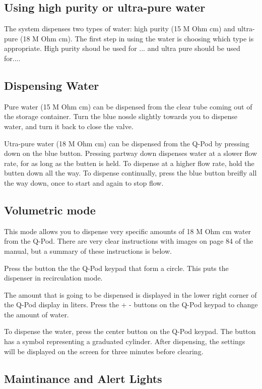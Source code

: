 \documentclass[12pt]{../SOP3_beta}\usepackage[]{graphicx}\usepackage[]{xcolor}
\begin{document}
\subsection{Using high purity or ultra-pure water}

\NP The system dispenses two types of water: high purity (15 M Ohm cm) and ultra-pure (18 M Ohm cm). The first step in using the water is choosing which type is appropriate. High purity shoud be used for ... and ultra pure should be used for....

\subsection{Dispensing Water}

\NP Pure water (15 M Ohm cm) can be dispensed from the clear tube coming out of the storage container. Turn the blue nossle slightly towards you to dispense water, and turn it back to close the valve. 

\NP Utra-pure water (18 M Ohm cm) can be dispensed from the Q-Pod by pressing down on the blue button. Pressing partway down dispenses water at a slower flow rate, for as long as the butten is held. To dispense at a higher flow rate, hold the butten down all the way. To dispense continually, press the blue button breifly all the way down, once to start and again to stop flow.  

\subsection{Volumetric mode}

\NP This mode allows you to dispense very specific amounts of 18 M Ohm cm water from the Q-Pod. There are very clear instructions with images on page 84 of the manual, but a summary of these instructions is below.

\NP Press the button the the Q-Pod keypad that form a circle. This puts the dispenser in recirculation mode. 

\NP The amount that is going to be dispensed is displayed in the lower right corner of the Q-Pod display in liters. Press the + - buttons on the Q-Pod keypad to change the amount of water. 

\NP To dispense the water, press the center button on the Q-Pod keypad. The button has a symbol representing a graduated cylinder. After dispensing, the settings will be displayed on the screen for three minutes before clearing.

\subsection{Maintinance and Alert Lights}
\end{document}
